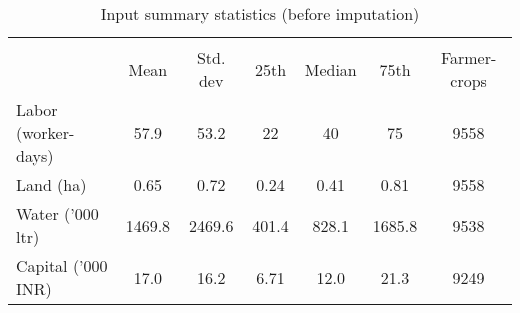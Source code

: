 \begin{table}[htbp]\centering
\def\sym#1{\ifmmode^{#1}\else\(^{#1}\)\fi}
\caption{Input summary statistics (before imputation) \label{tab:PreImputeInputSumStats}}
\begin{tabular}{l*{1}{cccccc}}
\toprule
                    &\multicolumn{6}{c}{}                                                         \\
                    &        Mean&    Std. dev&        25th&      Median&        75th&Farmer-crops\\
\midrule
Labor (worker-days) &        57.9&        53.2&          22&          40&          75&        9558\\
Land (ha)           &        0.65&        0.72&        0.24&        0.41&        0.81&        9558\\
Water ('000 ltr)    &      1469.8&      2469.6&       401.4&       828.1&      1685.8&        9538\\
Capital ('000 INR)  &        17.0&        16.2&        6.71&        12.0&        21.3&        9249\\
\bottomrule
\end{tabular}
\end{table}
